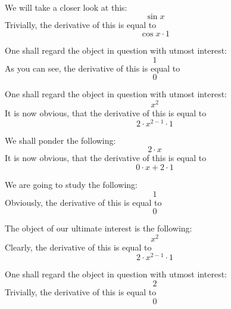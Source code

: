 \documentclass{article}
\begin{document}
We will take a closer look at this:
\begin{equation}
\sin x 
\end{equation}
Trivially, the derivative of this is equal to
\begin{equation}
\cos x \cdot 1 
\end{equation}

One shall regard the object in question with utmost interest:
\begin{equation}
1 
\end{equation}
As you can see, the derivative of this is equal to
\begin{equation}
0 
\end{equation}

One shall regard the object in question with utmost interest:
\begin{equation}
x ^{2 } 
\end{equation}
It is now obvious, that the derivative of this is equal to
\begin{equation}
2 \cdot x ^{2 - 1 } \cdot 1 
\end{equation}

We shall ponder the following:
\begin{equation}
2 \cdot x 
\end{equation}
It is now obvious, that the derivative of this is equal to
\begin{equation}
0 \cdot x + 2 \cdot 1 
\end{equation}

We are going to study the following:
\begin{equation}
1 
\end{equation}
Obviously, the derivative of this is equal to
\begin{equation}
0 
\end{equation}

The object of our ultimate interest is the following:
\begin{equation}
x ^{2 } 
\end{equation}
Clearly, the derivative of this is equal to
\begin{equation}
2 \cdot x ^{2 - 1 } \cdot 1 
\end{equation}

One shall regard the object in question with utmost interest:
\begin{equation}
2 
\end{equation}
Trivially, the derivative of this is equal to
\begin{equation}
0 
\end{equation}
\end{document}
